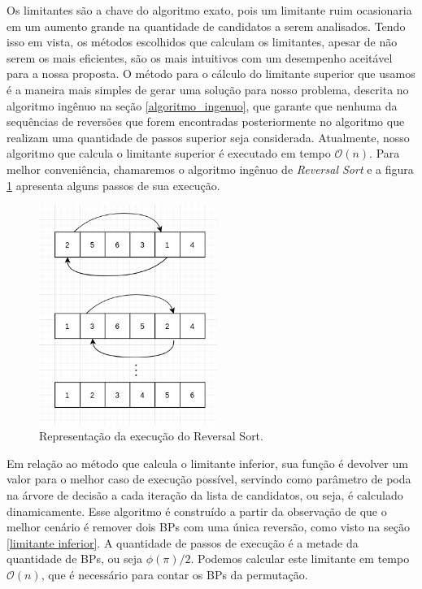 Os limitantes são a chave do algoritmo exato, pois um limitante ruim ocasionaria em um aumento grande na quantidade de candidatos a serem analisados. Tendo isso em vista, os métodos escolhidos que calculam os limitantes, apesar de não serem os mais eficientes, são os mais intuitivos com um desempenho aceitável para a nossa proposta. O método para o cálculo do limitante superior que usamos é a maneira mais simples de gerar uma solução para nosso problema, descrita no algoritmo ingênuo na seção \ref{algoritmo_ingenuo}, que garante que nenhuma da sequências de reversões que forem encontradas posteriormente no algoritmo que realizam uma quantidade de passos superior seja considerada. Atualmente, nosso algoritmo que calcula o limitante superior é executado em tempo $\mathcal{O}{(n)}$. Para melhor conveniência, chamaremos o algoritmo ingênuo de \textit{Reversal Sort} e a figura \ref{figura:Execução do Reversal Sort} apresenta alguns passos de sua execução.


\begin{figure}[h]
\centering %
\includegraphics[width=5.8cm]{Imagens/reversalSort.png} %
\caption{Representação da execução do Reversal Sort.}
\label{figura:Execução do Reversal Sort}
\end{figure}


Em relação ao método que calcula o limitante inferior, sua função é devolver um valor para o melhor caso de execução possível, servindo como parâmetro de poda na árvore de decisão a cada iteração da lista de candidatos, ou seja, é calculado dinamicamente. Esse algoritmo é construído a partir da observação de que o melhor cenário é remover dois BPs com uma única reversão, como visto na seção \ref{limitante inferior}. A quantidade de passos de execução é a metade da quantidade de BPs, ou seja $\phi(\pi)/2$. Podemos calcular este limitante em tempo $\mathcal{O}{(n)}$, que é necessário para contar os BPs da permutação.  


